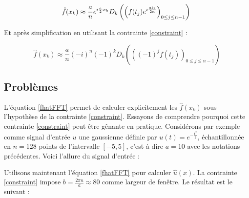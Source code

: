 \documentclass{article}
\begin{document}
\begin{equation*}
  \hat{f}(x_k) \approx  \frac{a}{n} e^{i\frac{a}{2}x_k} D_k\left( \left(f(t_j)e^{i\frac{abj}{2n}}\right)_{0\le j \le n-1} \right) \\
\end{equation*}

Et après simplification en utilisant la contrainte \eqref{constraint} :

\begin{equation}
  \hat{f}(x_k) \approx \frac{a}{n} (-i)^n(-1)^k D_k\left( \left((-1)^jf(t_j)\right)_{0\le j \le n-1} \right)
  \label{fhatFFT}
\end{equation}

\subsection{Problèmes} \label{sectionPB}
L'équation \eqref{fhatFFT} permet de calculer explicitement les $\hat{f}(x_k)$ sous l'hypothèse de la contrainte \eqref{constraint}. Essayons de comprendre pourquoi cette contrainte \eqref{constraint} peut être gênante en pratique. Considérons par exemple comme signal d'entrée $u$ une gaussienne définie par $u(t) = e^{-\frac{t^2}{2}}$, échantillonnée en $n = 128$ points de l'intervalle $[-5, 5]$, c'est à dire $a = 10$ avec les notations précédentes. Voici l'allure du signal d'entrée :

\begin{center}
\end{center}

Utilisons maintenant l'équation \eqref{fhatFFT} pour calculer $\hat{u}(x)$. La contrainte \eqref{constraint} impose $b = \frac{2\pi n}{a} \approx 80$ comme largeur de fenêtre. Le résultat est le suivant :

\begin{center}
\end{center}
\end{document}
